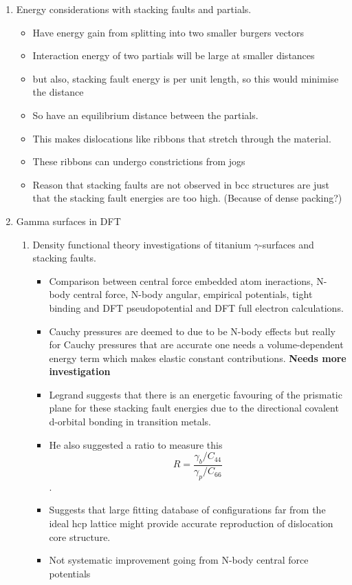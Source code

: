 \documentclass[11pt]{article}
\begin{document}
\begin{enumerate}
\item Energy considerations with stacking faults and partials.
\label{sec-2-2-5-5}
\begin{itemize}
\item Have energy gain from splitting into two smaller burgers vectors
\item Interaction energy of two partials will be large at smaller distances
\item but also, stacking fault energy is per unit length, so this would
minimise the distance
\item So have an equilibrium distance between the partials.
\item This makes dislocations like ribbons that stretch through the material.
\item These ribbons can undergo constrictions from jogs
\item Reason that stacking faults are not observed in bcc structures are just
that the stacking fault energies are too high. (Because of dense packing?)
\end{itemize}
\item Gamma surfaces in DFT
\label{sec-2-2-5-6}
\begin{enumerate}
\item{} Density functional theory investigations of titanium $\gamma$-surfaces and stacking faults.
\label{sec-2-2-5-6-1}
\begin{itemize}
\item Comparison between central force  embedded atom ineractions, N-body
central force, N-body angular, empirical potentials, tight binding and
DFT pseudopotential and DFT full electron calculations.
\item Cauchy pressures are deemed to due to be N-body effects but really for Cauchy
pressures that are accurate one needs a volume-dependent energy term
which makes elastic constant contributions. \textbf{\textbf{Needs more investigation}}
\item Legrand suggests that there is an energetic favouring of the prismatic
plane for these stacking fault energies due to the directional covalent
d-orbital bonding in transition metals.
\item He also suggested a ratio to measure this \[ R = \frac{\gamma_{b}/C_{44}}{\gamma_{p}/C_{66}} \].
\item Suggests that large fitting database of configurations far from the
ideal hcp lattice might provide accurate reproduction of dislocation
core structure.
\item Not systematic improvement going from N-body central force potentials

\end{itemize}
\end{enumerate}
\end{enumerate}
\end{document}
